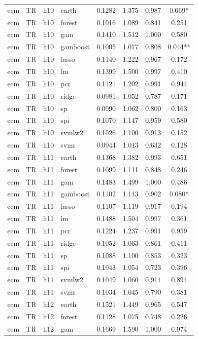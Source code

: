 \begin{ThreePartTable}
\begin{longtable}[t]{llclcccc}
\addlinespace
ecm & TR & h10 & earth & 0.1282 & 1.375 & 0.987 & 0.069*\\
ecm & TR & h10 & forest & 0.1016 & 1.089 & 0.841 & 0.251\\
ecm & TR & h10 & gam & 0.1410 & 1.512 & 1.000 & 0.580\\
ecm & TR & h10 & gamboost & 0.1005 & 1.077 & 0.808 & 0.044**\\
ecm & TR & h10 & lasso & 0.1140 & 1.222 & 0.967 & 0.172\\
ecm & TR & h10 & lm & 0.1399 & 1.500 & 0.997 & 0.410\\
ecm & TR & h10 & pcr & 0.1121 & 1.202 & 0.991 & 0.944\\
ecm & TR & h10 & ridge & 0.0981 & 1.052 & 0.787 & 0.171\\
ecm & TR & h10 & sp & 0.0990 & 1.062 & 0.800 & 0.163\\
ecm & TR & h10 & spi & 0.1070 & 1.147 & 0.959 & 0.580\\
ecm & TR & h10 & svmlw2 & 0.1026 & 1.100 & 0.913 & 0.152\\
ecm & TR & h10 & svmr & 0.0944 & 1.013 & 0.632 & 0.128\\
\addlinespace
ecm & TR & h11 & earth & 0.1368 & 1.382 & 0.993 & 0.651\\
ecm & TR & h11 & forest & 0.1099 & 1.111 & 0.848 & 0.246\\
ecm & TR & h11 & gam & 0.1483 & 1.499 & 1.000 & 0.486\\
ecm & TR & h11 & gamboost & 0.1102 & 1.113 & 0.902 & 0.080*\\
ecm & TR & h11 & lasso & 0.1107 & 1.119 & 0.917 & 0.194\\
ecm & TR & h11 & lm & 0.1488 & 1.504 & 0.997 & 0.361\\
ecm & TR & h11 & pcr & 0.1224 & 1.237 & 0.991 & 0.959\\
ecm & TR & h11 & ridge & 0.1052 & 1.063 & 0.861 & 0.411\\
ecm & TR & h11 & sp & 0.1088 & 1.100 & 0.853 & 0.323\\
ecm & TR & h11 & spi & 0.1043 & 1.054 & 0.723 & 0.396\\
ecm & TR & h11 & svmlw2 & 0.1049 & 1.060 & 0.914 & 0.894\\
ecm & TR & h11 & svmr & 0.1034 & 1.045 & 0.790 & 0.381\\
\addlinespace
ecm & TR & h12 & earth & 0.1521 & 1.449 & 0.965 & 0.547\\
ecm & TR & h12 & forest & 0.1128 & 1.075 & 0.748 & 0.226\\
ecm & TR & h12 & gam & 0.1669 & 1.590 & 1.000 & 0.974\\

\end{longtable}
\end{ThreePartTable}
